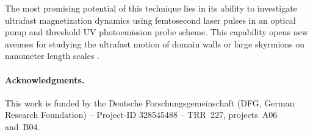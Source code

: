 \documentclass[prl,twocolumn,floatfix,superscriptaddress,aps]{revtex4-2}
\begin{document}
The most promising potential of this technique lies in its ability to investigate ultrafast magnetization dynamics using femtosecond laser pulses in an optical pump and threshold UV photoemission probe scheme. This capability opens new avenues for studying the ultrafast motion of domain walls \cite{parkin2008} or large skyrmions on nanometer length scales \cite{goebel2019,jani2021,kern2022}.

\paragraph{Acknowledgments.} This work is funded by the Deutsche Forschungsgemeinschaft (DFG, German Research Foundation) -- Project-ID 328545488 -- TRR~227, projects~A06 and~B04.

% 


\end{document}
